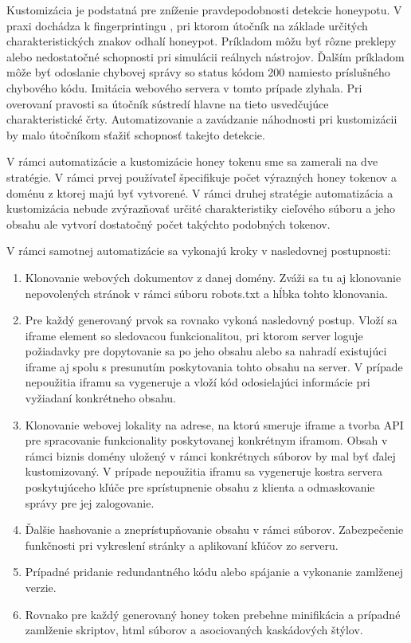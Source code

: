 \documentclass[conference, 11pt,slovak,a4paper,twoside]{IEEEtran}
\begin{document}
Kustomizácia je podstatná pre zníženie pravdepodobnosti detekcie honeypotu. V praxi dochádza k fingerprintingu \cite{mohammed_honeypots_2015}, pri ktorom útočník na základe určitých charakteristických znakov odhalí honeypot. Príkladom môžu byť rôzne preklepy alebo nedostatočné schopnosti pri simulácii reálnych nástrojov. Ďalším príkladom môže byť odoslanie chybovej správy so status kódom 200 namiesto príslušného chybového kódu. Imitácia webového servera v tomto prípade zlyhala. Pri overovaní pravosti sa útočník sústredí hlavne na tieto usvedčujúce charakteristické črty. Automatizovanie a zavádzanie náhodnosti pri kustomizácii by malo útočníkom sťažiť schopnosť takejto detekcie.

V rámci automatizácie a kustomizácie honey tokenu sme sa zamerali na dve stratégie. V rámci prvej používateľ špecifikuje počet výrazných honey tokenov a doménu z ktorej majú byť vytvorené. V rámci druhej stratégie automatizácia a kustomizácia nebude zvýrazňovať určité charakteristiky cieľového súboru a jeho obsahu ale vytvorí dostatočný počet takýchto podobných tokenov.

V rámci samotnej automatizácie sa vykonajú kroky v nasledovnej postupnosti:
\begin{enumerate}
	\item Klonovanie webových dokumentov z danej domény. Zváži sa tu aj klonovanie nepovolených stránok v rámci súboru robots.txt a hĺbka tohto klonovania.

	\item Pre každý generovaný prvok sa rovnako vykoná nasledovný postup. Vloží sa iframe element so sledovacou funkcionalitou, pri ktorom server loguje požiadavky pre dopytovanie sa po jeho obsahu alebo sa nahradí existujúci iframe aj spolu s presunutím poskytovania tohto obsahu na server. V prípade nepoužitia iframu sa vygeneruje a vloží kód odosielajúci informácie pri vyžiadaní konkrétneho obsahu.
	
	\item Klonovanie webovej lokality na adrese, na ktorú smeruje iframe a tvorba API pre spracovanie funkcionality poskytovanej konkrétnym iframom. Obsah v rámci biznis domény uložený v rámci konkrétnych súborov by mal byť ďalej kustomizovaný. V prípade nepoužitia iframu sa vygeneruje kostra servera poskytujúceho kľúče pre sprístupnenie obsahu z klienta a odmaskovanie správy pre jej zalogovanie.
	
	\item Ďalšie hashovanie a zneprístupňovanie obsahu v rámci súborov. Zabezpečenie funkčnosti pri vykreslení stránky a aplikovaní kľúčov zo serveru.
	
	\item Prípadné pridanie redundantného kódu alebo spájanie a vykonanie zamlženej verzie.
	
	\item Rovnako pre každý generovaný honey token prebehne minifikácia a prípadné zamlženie skriptov, html súborov a asociovaných kaskádových štýlov. 
\end{enumerate}
\end{document}
